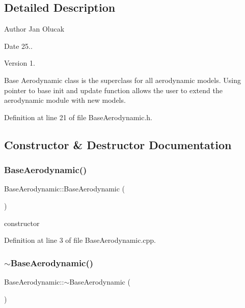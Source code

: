 \subsection{Detailed Description}
\begin{DoxyAuthor}{Author}
Jan Olucak 
\end{DoxyAuthor}
\begin{DoxyDate}{Date}
25.. 
\end{DoxyDate}
\begin{DoxyVersion}{Version}
1.
\end{DoxyVersion}
Base Aerodynamic class is the superclass for all aerodynamic models. Using pointer to base init and update function allows the user to extend the aerodynamic module with new models. 

Definition at line 21 of file Base\+Aerodynamic.\+h.



\subsection{Constructor \& Destructor Documentation}
\mbox{\label{class_base_aerodynamic_aa05d0598119b1364cdb45cf478ae578c}} 
\subsubsection{\texorpdfstring{Base\+Aerodynamic()}{BaseAerodynamic()}}
{\footnotesize\ttfamily Base\+Aerodynamic\+::\+Base\+Aerodynamic (\begin{DoxyParamCaption}{ }\end{DoxyParamCaption})}



constructor 



Definition at line 3 of file Base\+Aerodynamic.\+cpp.

\mbox{\label{class_base_aerodynamic_a81d08f3a779e6e25245b6f3b545920cb}} 
\subsubsection{\texorpdfstring{$\sim$\+Base\+Aerodynamic()}{~BaseAerodynamic()}}
{\footnotesize\ttfamily Base\+Aerodynamic\+::$\sim$\+Base\+Aerodynamic (\begin{DoxyParamCaption}{ }\end{DoxyParamCaption})}



